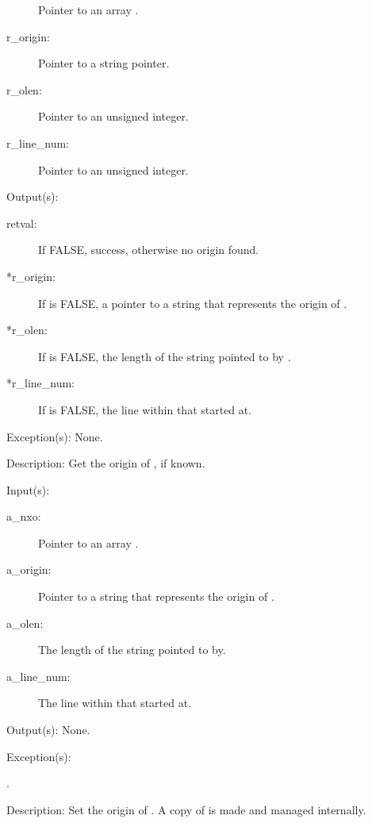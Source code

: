 \begin{capi}
\begin{capilist}
\begin{description}
			Pointer to an array .
		\item[r\_origin: ] Pointer to a string pointer.
		\item[r\_olen: ] Pointer to an unsigned integer.
		\item[r\_line\_num: ] Pointer to an unsigned integer.
		\end{description}
	\item[Output(s): ]
		\begin{description}\item[]
		\item[retval: ] If FALSE, success, otherwise no origin found.
		\item[*r\_origin: ]
			If  is FALSE, a pointer to a string that
			represents the origin of .
		\item[*r\_olen: ]
			If  is FALSE, the length of the string
			pointed to by .
		\item[*r\_line\_num: ]
			If  is FALSE, the line within
			 that  started at.
		\end{description}
	\item[Exception(s): ] None.
	\item[Description: ]
		Get the origin of , if known.
	\end{capilist}
\label{nxo_array_origin_set}
	\begin{capilist}
	\item[Input(s): ]
		\begin{description}\item[]
		\item[a\_nxo: ]
			Pointer to an array .
		\item[a\_origin: ]
			Pointer to a string that represents the origin of
			.
		\item[a\_olen: ]
			The length of the string pointed to by.
		\item[a\_line\_num: ]
			The line within  that 
			started at.
		\end{description}
	\item[Output(s): ] None.
	\item[Exception(s): ]
		\begin{description}\item[]
		\item[.]
		\end{description}
	\item[Description: ]
		Set the origin of .  A copy of  is
		made and managed internally.
	\end{capilist}
\end{capi}
